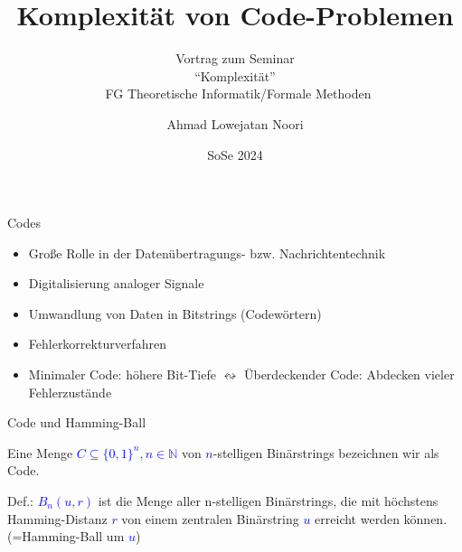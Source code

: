 \documentclass[10pt, aspectratio=169]{beamer}
\title{\textbf{Komplexität von Code-Problemen}}
\subtitle{Vortrag zum Seminar \\ ``Komplexität''\\\ FG Theoretische Informatik/Formale Methoden}
\author{Ahmad Lowejatan Noori}
\institute{FB Elektrotechnik/Informatik, Universität Kassel}
\date{SoSe 2024}
\begin{document}
\begin{frame}  
    \titlepage
\end{frame}
\begin{frame}{Codes}

\begin{itemize}
    \item Große Rolle in der \alert{Datenübertragungs- bzw. Nachrichtentechnik}
    \item Digitalisierung analoger Signale
    \item Umwandlung von Daten in Bitstrings (Codewörtern)
    \item \alert{Fehlerkorrekturverfahren}
    \item Minimaler Code: höhere Bit-Tiefe $\leftrightsquigarrow$ Überdeckender Code: Abdecken vieler Fehlerzustände
\end{itemize}


\end{frame}

\begin{frame}{Code und Hamming-Ball}


Eine Menge  \textcolor{blue}{$C \subseteq\{0,1\}^n$$, n \in \mathbb{N}$} von \textcolor{blue}{$n$}-stelligen Binärstrings bezeichnen wir als  \alert{Code}.\newline

Def.: \textcolor{blue}{$B_n(u,r)$} ist die Menge aller n-stelligen Binärstrings, die mit höchstens Hamming-Distanz \textcolor{blue}{$r$} von einem zentralen Binärstring \textcolor{blue}{$u$} erreicht werden können. (=\alert{Hamming-Ball} um \textcolor{blue}{$u$})\newline

\end{frame}
\end{document}

